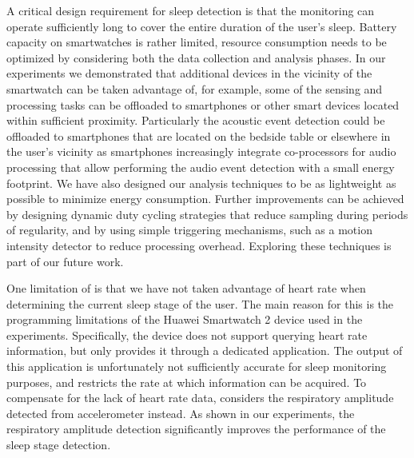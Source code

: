  A critical design requirement for sleep detection is that the monitoring can operate sufficiently long to cover
the entire duration of the user's sleep. Battery capacity on smartwatches is rather limited, resource consumption needs to be optimized by
considering both the data collection and analysis phases. In our experiments we demonstrated that additional devices in the vicinity of the
smartwatch can be taken advantage of, for example, some of the sensing and processing tasks can be offloaded to smartphones or other smart
devices located within sufficient proximity. Particularly the acoustic event detection could be offloaded to smartphones that are located
on the bedside table or elsewhere in the user's vicinity as smartphones increasingly integrate co-processors for audio processing that
allow performing the audio event detection with a small energy footprint. We have also designed our analysis techniques to be as
lightweight as possible to minimize energy consumption. Further improvements can be achieved by designing dynamic duty cycling strategies
that reduce sampling during periods of regularity, and by using simple triggering mechanisms, such as a motion intensity detector to reduce
processing overhead. Exploring these techniques is part of our future work.


 One limitation of {\systemname} is that we have not taken advantage of heart rate when determining the current
sleep stage of the user. The main reason for this is the programming limitations of the Huawei Smartwatch 2 device used in the experiments.
Specifically, the device does not support querying heart rate information, but only provides it through a dedicated application. The output
of this application is unfortunately not sufficiently accurate for sleep monitoring purposes, and restricts the rate at which information
can be acquired. To compensate for the lack of heart rate data, {\systemname} considers the respiratory amplitude detected from
accelerometer instead. As shown in our experiments, the respiratory amplitude detection significantly improves the performance of the sleep
stage detection.

